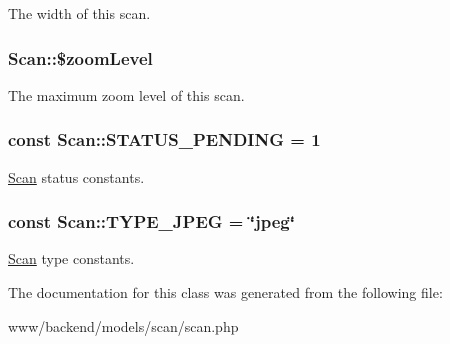 \label{classScan_a9d74b1c9b56be79120ff60afea7260c6}
The width of this scan. \hypertarget{classScan_ade9d70de4af2677cd62ce8b9604cb3f2}{
\subsubsection[{\$zoomLevel}]{\setlength{\rightskip}{0pt plus 5cm}Scan::\$zoomLevel}}
\label{classScan_ade9d70de4af2677cd62ce8b9604cb3f2}
The maximum zoom level of this scan. \hypertarget{classScan_a0a517a759400b21e5814247523d527de}{
\subsubsection[{STATUS\_\-PENDING}]{\setlength{\rightskip}{0pt plus 5cm}const {\bf Scan::STATUS\_\-PENDING} = 1}}
\label{classScan_a0a517a759400b21e5814247523d527de}
\hyperlink{classScan}{Scan} status constants. \hypertarget{classScan_a9837751227b9fa341e447d81e9f6057f}{
\subsubsection[{TYPE\_\-JPEG}]{\setlength{\rightskip}{0pt plus 5cm}const {\bf Scan::TYPE\_\-JPEG} = \char`\"{}jpeg\char`\"{}}}
\label{classScan_a9837751227b9fa341e447d81e9f6057f}
\hyperlink{classScan}{Scan} type constants. 

The documentation for this class was generated from the following file:\begin{DoxyCompactItemize}
\item 
www/backend/models/scan/scan.php\end{DoxyCompactItemize}
